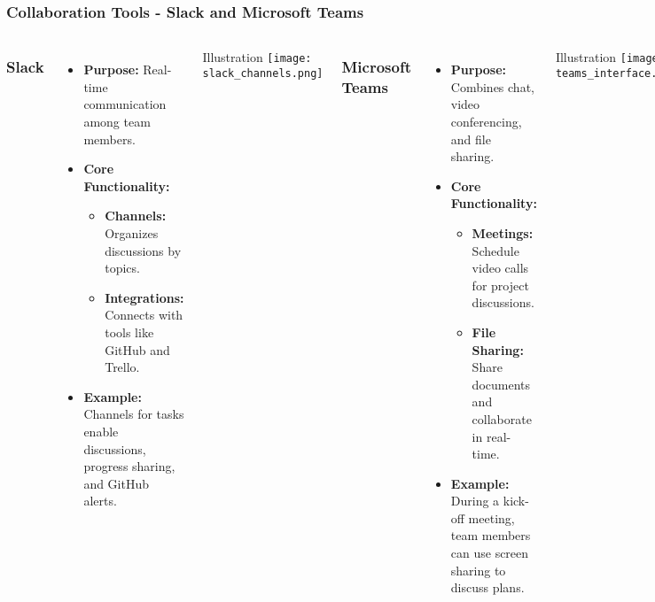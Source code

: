 \documentclass[aspectratio=169]{beamer}
\begin{document}
\begin{frame}[fragile]
    \frametitle{Collaboration Tools - Slack and Microsoft Teams}
    \begin{columns}
        \frametitle{Slack}
        \begin{itemize}
            \item \textbf{Purpose:} Real-time communication among team members.
            \item \textbf{Core Functionality:}
            \begin{itemize}
                \item \textbf{Channels:} Organizes discussions by topics.
                \item \textbf{Integrations:} Connects with tools like GitHub and Trello.
            \end{itemize}
            \item \textbf{Example:} Channels for tasks enable discussions, progress sharing, and GitHub alerts.
        \end{itemize}
        \begin{block}{Illustration}
            \centering
            \texttt{[image: slack\_channels.png]}
        \end{block}

        \frametitle{Microsoft Teams}
        \begin{itemize}
            \item \textbf{Purpose:} Combines chat, video conferencing, and file sharing.
            \item \textbf{Core Functionality:}
            \begin{itemize}
                \item \textbf{Meetings:} Schedule video calls for project discussions.
                \item \textbf{File Sharing:} Share documents and collaborate in real-time.
            \end{itemize}
            \item \textbf{Example:} During a kick-off meeting, team members can use screen sharing to discuss plans.
        \end{itemize}
        \begin{block}{Illustration}
            \centering
            \texttt{[image: teams\_interface.png]}
        \end{block}
    \end{columns}
\end{frame}
\end{document}
